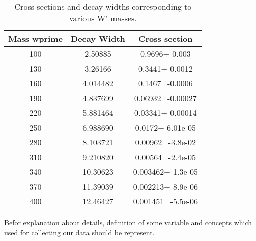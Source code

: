  \begin{table}[htb]
	\centering
\begin{tabular}{|ccc|}
\hline 
Mass wprime  &  Decay Width  &  Cross section\\
\hline 
100 & 2.50885 & 0.9696+-0.003  \\
130 & 3.26166& 0.3441+-0.0012 \\
160 & 4.014482 &0.1467+-0.0006 \\
190 & 4.837699 &0.06932+-0.00027 \\
 220& 5.881464& 0.03341+-0.00014 \\
 250 &6.988690 &0.0172+-6.01e-05 \\
 280 &8.103721 &0.00962+-3.8e-02 \\
 310 &9.210820 &0.00564+-2.4e-05 \\
 340 &10.30623 &0.003462+-1.3e-05 \\
 370 &11.39039& 0.002213+-8.9e-06\\ 
 400 &12.46427 &0.001451+-5.5e-06\\
\hline
\end{tabular}
\caption{Cross sections and decay widths corresponding to various W' masses. \label{tab1} }
\end{table}

 
Befor explanation about details, definition of some variable and concepts which used for collecting our data should be represent. 